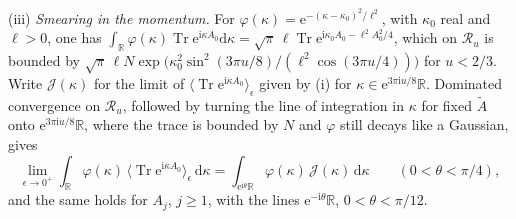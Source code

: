 (iii) \emph{Smearing in the momentum.} For \(\varphi(\kappa)=\mathrm e^{-(\kappa-\kappa_0)^2/\ell^2}\), with \(\kappa_0\) real and \(\ell>0\), one has \(\int_{\mathbb R}\varphi(\kappa)\operatorname{Tr}\mathrm e^{\mathrm i\kappa A_0}\mathrm d\kappa=\sqrt\pi\,\ell\operatorname{Tr}\mathrm e^{\mathrm i\kappa_0A_0-\ell^2A_0^2/4}\), which on \(\mathcal R_u\) is bounded by \(\sqrt\pi\,\ell N\exp\bigl(\kappa_0^2\sin^2(3\pi u/8)/(\ell^2\cos(3\pi u/4))\bigr)\) for \(u<2/3\). Write \(\mathcal J(\kappa)\) for the limit of \(\langle\operatorname{Tr}\mathrm e^{\mathrm i\kappa A_0}\rangle_\epsilon\) given by (i) for \(\kappa\in\mathrm e^{3\pi\mathrm iu/8}\mathbb R\). Dominated convergence on \(\mathcal R_u\), followed by turning the line of integration in \(\kappa\) for fixed \(\tilde A\) onto \(\mathrm e^{3\pi\mathrm iu/8}\mathbb R\), where the trace is bounded by \(N\) and \(\varphi\) still decays like a Gaussian, gives
\[
\lim_{\epsilon\to0^+}\int_{\mathbb R}\varphi(\kappa)\,\langle\operatorname{Tr}\mathrm e^{\mathrm i\kappa A_0}\rangle_\epsilon\,\mathrm d\kappa=\int_{\mathrm e^{\mathrm i\theta}\mathbb R}\varphi(\kappa)\,\mathcal J(\kappa)\,\mathrm d\kappa\qquad(0<\theta<\pi/4),
\]
and the same holds for \(A_j\), \(j\ge1\), with the lines \(\mathrm e^{-\mathrm i\theta}\mathbb R\), \(0<\theta<\pi/12\).

